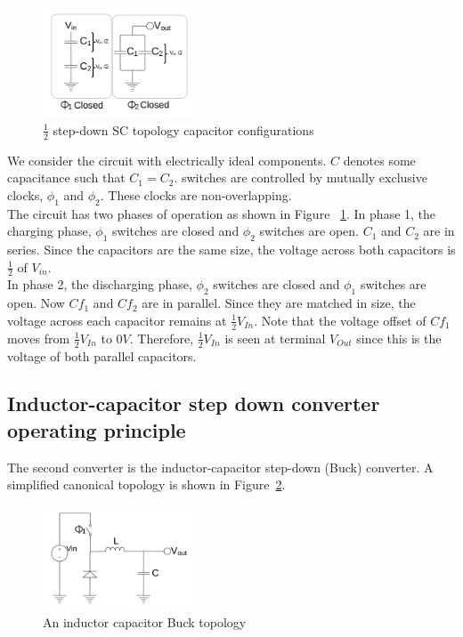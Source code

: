 \documentclass[letterpaper,twocolumn,10pt]{article}
\begin{document}
\begin{figure}[here]
\includegraphics[width=0.4\textwidth]{SCTopologyII}
\caption{$\frac{1}{2}$ step-down SC topology capacitor configurations}
\label{SCTopologyII}
\end{figure}

We consider the circuit with electrically ideal components. $C$ denotes some capacitance such that $C_1 = C_2$. switches are controlled by mutually exclusive clocks, $\phi_1$ and $\phi_2$. These clocks are non-overlapping.\\
The circuit has two phases of operation as shown in Figure ~\ref{SCTopologyII}. In phase 1, the charging phase, $\phi_1$ switches are closed and $\phi_2$ switches are open. $C_1$ and $C_2$ are in series. Since the capacitors are the same size, the voltage across both capacitors is $\frac{1}{2}$ of $V_{in}$.\\
In phase 2, the discharging phase, $\phi_2$ switches are closed and $\phi_1$ switches are open. Now $Cf_1$ and $Cf_2$ are in parallel. Since they are matched in size, the voltage across each capacitor remains at $\frac{1}{2} V_{In}$. Note that the voltage offset of $Cf_1$ moves from $\frac{1}{2} V_{In}$ to $0V$. Therefore, $\frac{1}{2} V_{In}$ is seen at terminal $V_{Out}$ since this is the voltage of both parallel capacitors.\\

\subsection{Inductor-capacitor step down converter operating principle}

The second converter is the inductor-capacitor step-down (Buck) converter. A simplified canonical topology is shown in Figure~\ref{BKTopology}.\\
\begin{figure}[here]
\includegraphics[width=0.4\textwidth]{BKTopology}
\caption{An inductor capacitor Buck topology}
\label{BKTopology}
\end{figure}
\end{document}

